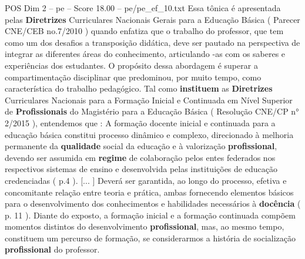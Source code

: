 \begin{textsample}{POS Dim 2 – pe – Score 18.00 – pe/pe\_ef\_10.txt}
Essa tônica é apresentada pelas \textbf{Diretrizes} Curriculares Nacionais Gerais para a Educação Básica ( Parecer CNE/CEB no.7/2010 ) quando enfatiza que o trabalho do professor, que tem como um dos desafios a transposição didática, deve ser pautado na perspectiva de integrar as diferentes áreas do conhecimento, articulando -as com os saberes e experiências dos estudantes.
O propósito dessa abordagem é superar a compartimentação disciplinar que predominou, por muito tempo, como característica do trabalho pedagógico.
Tal como \textbf{instituem} as \textbf{Diretrizes} Curriculares Nacionais para a Formação Inicial e Continuada em Nível Superior de \textbf{Profissionais} do Magistério para a Educação Básica ( Resolução CNE/CP n{\EmojiFont °} 2/2015 ), entendemos que : A formação docente inicial e continuada para a educação básica constitui processo dinâmico e complexo, direcionado à melhoria permanente da \textbf{qualidade} social da educação e à valorização \textbf{profissional}, devendo ser assumida em \textbf{regime} de colaboração pelos entes federados nos respectivos sistemas de ensino e desenvolvida pelas instituições de educação credenciadas ( p.4 ). [... ] Deverá ser garantida, ao longo do processo, efetiva e concomitante relação entre teoria e prática, ambas fornecendo elementos básicos para o desenvolvimento dos conhecimentos e habilidades necessários à \textbf{docência} ( p. 11 ).
Diante do exposto, a formação inicial e a formação continuada compõem momentos distintos do desenvolvimento \textbf{profissional}, mas, ao mesmo tempo, constituem um percurso de formação, se considerarmos a história de socialização \textbf{profissional} do professor.

\end{textsample}
